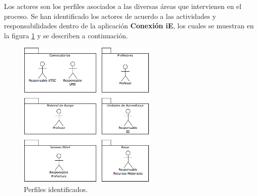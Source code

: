 Los actores son los perfiles asociados a las diversas áreas que intervienen en el proceso. Se han identificado los actores de acuerdo a las actividades y responsabilidades dentro de la aplicación \textbf{Conexión iE}, los cuales se muestran en la figura \ref{fig:perfilesWeb} y se describen a continuación.


    \begin{figure}[h!]
      \begin{center}
	  \includegraphics[width=0.6\textwidth]{images/actores/Actores.png}
      \caption{Perfiles identificados.}
      \label{fig:perfilesWeb}
      \end{center}
    \end{figure}

